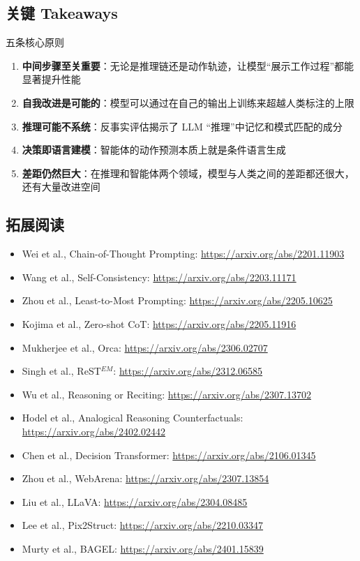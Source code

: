 \subsection{关键 Takeaways}

\begin{importantbox}{五条核心原则}
\begin{enumerate}
    \item \textbf{中间步骤至关重要}：无论是推理链还是动作轨迹，让模型``展示工作过程''都能显著提升性能
    \item \textbf{自我改进是可能的}：模型可以通过在自己的输出上训练来超越人类标注的上限
    \item \textbf{推理可能不系统}：反事实评估揭示了 LLM ``推理''中记忆和模式匹配的成分
    \item \textbf{决策即语言建模}：智能体的动作预测本质上就是条件语言生成
    \item \textbf{差距仍然巨大}：在推理和智能体两个领域，模型与人类之间的差距都还很大，还有大量改进空间
\end{enumerate}
\end{importantbox}

\subsection{拓展阅读}

\begin{itemize}
    \item Wei et al., Chain-of-Thought Prompting: \url{https://arxiv.org/abs/2201.11903}
    \item Wang et al., Self-Consistency: \url{https://arxiv.org/abs/2203.11171}
    \item Zhou et al., Least-to-Most Prompting: \url{https://arxiv.org/abs/2205.10625}
    \item Kojima et al., Zero-shot CoT: \url{https://arxiv.org/abs/2205.11916}
    \item Mukherjee et al., Orca: \url{https://arxiv.org/abs/2306.02707}
    \item Singh et al., ReST$^{EM}$: \url{https://arxiv.org/abs/2312.06585}
    \item Wu et al., Reasoning or Reciting: \url{https://arxiv.org/abs/2307.13702}
    \item Hodel et al., Analogical Reasoning Counterfactuals: \url{https://arxiv.org/abs/2402.02442}
    \item Chen et al., Decision Transformer: \url{https://arxiv.org/abs/2106.01345}
    \item Zhou et al., WebArena: \url{https://arxiv.org/abs/2307.13854}
    \item Liu et al., LLaVA: \url{https://arxiv.org/abs/2304.08485}
    \item Lee et al., Pix2Struct: \url{https://arxiv.org/abs/2210.03347}
    \item Murty et al., BAGEL: \url{https://arxiv.org/abs/2401.15839}
\end{itemize}


